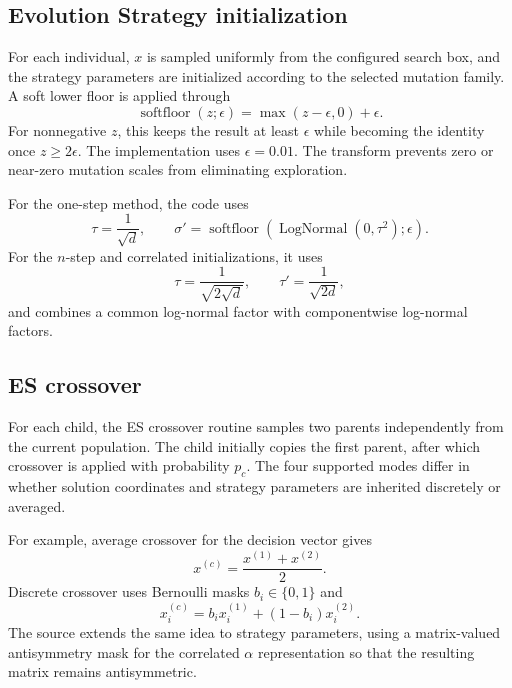 \documentclass[11pt,a4paper]{article}
\begin{document}
\subsection{Evolution Strategy initialization}
For each individual, $x$ is sampled uniformly from the configured search box, and the strategy parameters are initialized according to the selected mutation family. A soft lower floor is applied through
\begin{equation}
\operatorname{softfloor}(z;\epsilon)=\max(z-\epsilon,0)+\epsilon.
\end{equation}
For nonnegative $z$, this keeps the result at least $\epsilon$ while becoming the identity once $z\geq 2\epsilon$. The implementation uses $\epsilon=0.01$. The transform prevents zero or near-zero mutation scales from eliminating exploration.

For the one-step method, the code uses
\begin{equation}
\tau=\frac{1}{\sqrt{d}},
\qquad
\sigma' = \operatorname{softfloor}(\operatorname{LogNormal}(0,\tau^2);\epsilon).
\end{equation}
For the $n$-step and correlated initializations, it uses
\begin{equation}
\tau=\frac{1}{\sqrt{2\sqrt{d}}},
\qquad
\tau'=\frac{1}{\sqrt{2d}},
\end{equation}
and combines a common log-normal factor with componentwise log-normal factors.

\subsection{ES crossover}
For each child, the ES crossover routine samples two parents independently from the current population. The child initially copies the first parent, after which crossover is applied with probability $p_c$. The four supported modes differ in whether solution coordinates and strategy parameters are inherited discretely or averaged.

For example, average crossover for the decision vector gives
\begin{equation}
x^{(c)}=\frac{x^{(1)}+x^{(2)}}{2}.
\end{equation}
Discrete crossover uses Bernoulli masks $b_i\in\{0,1\}$ and
\begin{equation}
x_i^{(c)}=b_i x_i^{(1)}+(1-b_i)x_i^{(2)}.
\end{equation}
The source extends the same idea to strategy parameters, using a matrix-valued antisymmetry mask for the correlated $\alpha$ representation so that the resulting matrix remains antisymmetric.
\end{document}
